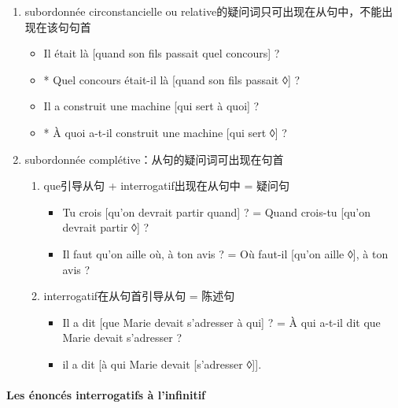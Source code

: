 \documentclass[UTF8]{report}
\begin{document}
\begin{enumerate}
    \begin{enumerate}
        \item subordonnée circonstancielle ou relative的疑问词只可出现在从句中，不能出现在该句句首
        \begin{itemize}
            \item Il était là [quand son fils passait quel concours] ?
            \item * Quel concours était-il là [quand son fils passait ◊] ?
            \item Il a construit une machine [qui sert à quoi] ?
            \item * À quoi a-t-il construit une machine [qui sert ◊] ?
        \end{itemize}
        \item subordonnée complétive：从句的疑问词可出现在句首
        \begin{enumerate}
            \item que引导从句 + interrogatif出现在从句中 = 疑问句
            \begin{itemize}
                \item Tu crois [qu’on devrait partir quand] ? = Quand crois-tu [qu’on devrait partir ◊] ?
                \item Il faut qu’on aille où, à ton avis ? = Où faut-il [qu’on aille ◊], à ton avis ?
            \end{itemize}
            \item interrogatif在从句首引导从句 = 陈述句
            \begin{itemize}
                \item Il a dit [que Marie devait s’adresser à qui] ? = À qui a-t-il dit que Marie devait s’adresser ?
                \item il a dit [à qui Marie devait [s’adresser ◊]].
            \end{itemize}
        \end{enumerate}
    \end{enumerate}
\end{enumerate}


\paragraph{Les énoncés interrogatifs à l’infinitif}
\end{document}
